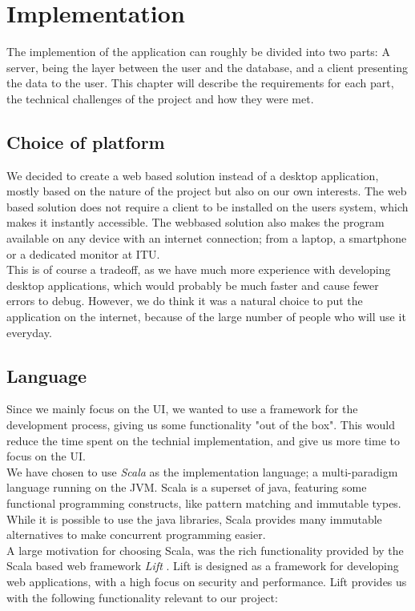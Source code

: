 \chapter{Implementation}
The implemention of the application can roughly be divided into two parts: A server, being the layer between the user and the database, and a client presenting the data to the user. This chapter will describe the requirements for each part, the technical challenges of the project and how they were met.


\section{Choice of platform}
We decided to create a web based solution instead of a desktop application, mostly based on the nature of the project but also on our own interests. The web based solution does not require a client to be installed on the users system, which makes it instantly accessible. The webbased solution also makes the program available on any device with an internet connection; from a laptop, a smartphone or a dedicated monitor at ITU.\\

This is of course a tradeoff, as we have much more experience with developing desktop applications, which would probably be much faster and cause fewer errors to debug. However, we do think it was a natural choice to put the application on the internet, because of the large number of people who will use it everyday.

\section{Language}
Since we mainly focus on the UI, we wanted to use a framework for the development process, giving us some functionality "out of the box". This would reduce the time spent on the technial implementation, and give us more time to focus on the UI.\\
We have chosen to use \emph{Scala}\cite{scala} as the implementation language; a multi-paradigm language running on the JVM. Scala is a superset of java, featuring some functional programming constructs, like pattern matching and immutable types. While it is possible to use the java libraries, Scala provides many immutable alternatives to make concurrent programming easier. \\

A large motivation for choosing Scala, was the rich functionality provided by the Scala based web framework \emph{Lift} \cite{lift}. Lift is designed as a framework for developing web applications, with a high focus on security and performance. Lift provides us with the following functionality relevant to our project:

